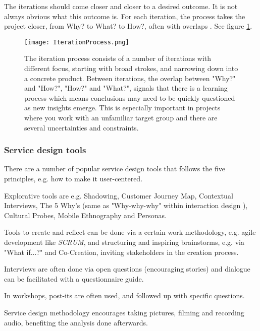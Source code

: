 The iterations should come closer and closer to a desired outcome. It is not always obvious what this outcome is. For each iteration, the process takes the project closer, from Why? to What? to How?, often with overlaps \cite{expedition-mondial}. See figure \ref{fig:iterationprocess}.


\begin{figure}[h]
    \centering
    \texttt{[image: IterationProcess.png]}
    \caption{The iteration process consists of a number of iterations with different focus, starting with broad strokes, and narrowing down into a concrete product. Between iterations, the overlap between "Why?" and "How?", "How?" and "What?", signals that there is a learning process which means conclusions may need to be quickly questioned as new insights emerge. This is especially important in projects where you work with an unfamiliar target group and there are several uncertainties and constraints.}
    \label{fig:iterationprocess}
\end{figure}

\subsubsection{Service design tools}

There are a number of popular service design tools that follows the five principles, e.g. how to make it user-centered.

Explorative tools are e.g. Shadowing, Customer Journey Map, Contextual Interviews, The 5 Why's (same as "Why-why-why" within interaction design \cite{thoughtful}), Cultural Probes, Mobile Ethnography and Personas.

Tools to create and reflect can be done via a certain work methodology, e.g. agile development like \textit{SCRUM}, and structuring and inspiring brainstorms, e.g. via "What if...?" and Co-Creation, inviting stakeholders in the creation process.

Interviews are often done via open questions (encouraging stories) and dialogue can be facilitated with a questionnaire guide.

In workshops, post-its are often used, and followed up with specific questions.

Service design methodology encourages taking pictures, filming and recording audio, benefiting the analysis done afterwards.

%


%

%
